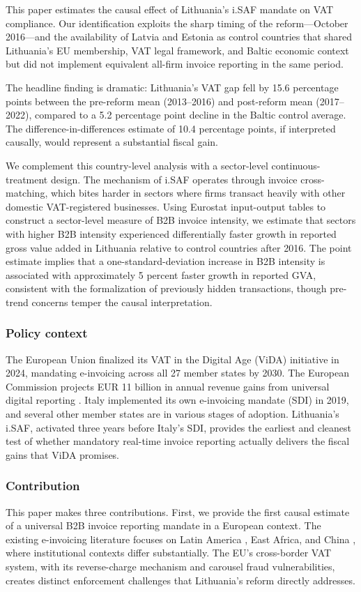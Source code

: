 \documentclass[12pt]{article}
\begin{document}
This paper estimates the causal effect of Lithuania's i.SAF mandate on VAT compliance. Our identification exploits the sharp timing of the reform---October 2016---and the availability of Latvia and Estonia as control countries that shared Lithuania's EU membership, VAT legal framework, and Baltic economic context but did not implement equivalent all-firm invoice reporting in the same period.

The headline finding is dramatic: Lithuania's VAT gap fell by 15.6 percentage points between the pre-reform mean (2013--2016) and post-reform mean (2017--2022), compared to a 5.2 percentage point decline in the Baltic control average. The difference-in-differences estimate of 10.4 percentage points, if interpreted causally, would represent a substantial fiscal gain.

We complement this country-level analysis with a sector-level continuous-treatment design. The mechanism of i.SAF operates through invoice cross-matching, which bites harder in sectors where firms transact heavily with other domestic VAT-registered businesses. Using Eurostat input-output tables to construct a sector-level measure of B2B invoice intensity, we estimate that sectors with higher B2B intensity experienced differentially faster growth in reported gross value added in Lithuania relative to control countries after 2016. The point estimate implies that a one-standard-deviation increase in B2B intensity is associated with approximately 5 percent faster growth in reported GVA, consistent with the formalization of previously hidden transactions, though pre-trend concerns temper the causal interpretation.

\subsubsection*{Policy context} The European Union finalized its VAT in the Digital Age (ViDA) initiative in 2024, mandating e-invoicing across all 27 member states by 2030. The European Commission projects EUR 11 billion in annual revenue gains from universal digital reporting \citep{EC2022vida}. Italy implemented its own e-invoicing mandate (SDI) in 2019, and several other member states are in various stages of adoption. Lithuania's i.SAF, activated three years before Italy's SDI, provides the earliest and cleanest test of whether mandatory real-time invoice reporting actually delivers the fiscal gains that ViDA promises.

\subsubsection*{Contribution} This paper makes three contributions. First, we provide the first causal estimate of a universal B2B invoice reporting mandate in a European context. The existing e-invoicing literature focuses on Latin America \citep{Bellon2022}, East Africa, and China \citep{Fan2018}, where institutional contexts differ substantially. The EU's cross-border VAT system, with its reverse-charge mechanism and carousel fraud vulnerabilities, creates distinct enforcement challenges that Lithuania's reform directly addresses.
\end{document}
